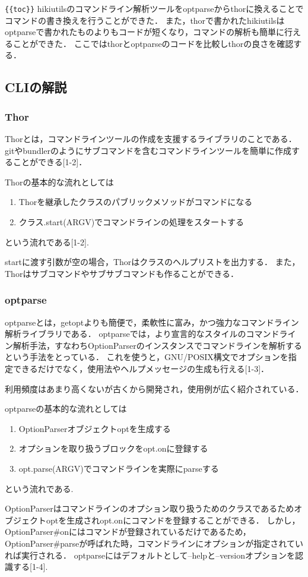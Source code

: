 \verb|{{toc}}|
hikiutilsのコマンドライン解析ツールをoptparseからthorに換えることでコマンドの書き換えを行うことができた．
また，thorで書かれたhikiutilsはoptparseで書かれたものよりもコードが短くなり，コマンドの解析も簡単に行えることができた．
ここではthorとoptparseのコードを比較しthorの良さを確認する．

\subsection{CLIの解説}
\subsubsection{Thor}
Thorとは，コマンドラインツールの作成を支援するライブラリのことである．
gitやbundlerのようにサブコマンドを含むコマンドラインツールを簡単に作成することができる[1-2]．

Thorの基本的な流れとしては
\begin{enumerate}
\item Thorを継承したクラスのパブリックメソッドがコマンドになる
\item クラス.start(ARGV)でコマンドラインの処理をスタートする
\end{enumerate}
という流れである[1-2].

startに渡す引数が空の場合，Thorはクラスのヘルプリストを出力する．
また，Thorはサブコマンドやサブサブコマンドも作ることができる．

\subsubsection{optparse}
optparseとは，getoptよりも簡便で，柔軟性に富み，かつ強力なコマンドライン解析ライブラリである．
optparseでは，より宣言的なスタイルのコマンドライン解析手法，すなわちOptionParserのインスタンスでコマンドラインを解析するという手法をとっている．
これを使うと，GNU/POSIX構文でオプションを指定できるだけでなく，使用法やヘルプメッセージの生成も行える[1-3]．

利用頻度はあまり高くないが古くから開発され，使用例が広く紹介されている．

optparseの基本的な流れとしては
\begin{enumerate}
\item OptionParserオブジェクトoptを生成する
\item オプションを取り扱うブロックをopt.onに登録する
\item opt.parse(ARGV)でコマンドラインを実際にparseする
\end{enumerate}
という流れである.

OptionParserはコマンドラインのオプション取り扱うためのクラスであるためオブジェクトoptを生成されopt.onにコマンドを登録することができる．
しかし，OptionParser\#onにはコマンドが登録されているだけであるため，OptionParser\#parseが呼ばれた時，コマンドラインにオプションが指定されていれば実行される．
optparseにはデフォルトとして--helpと--versionオプションを認識する[1-4].

